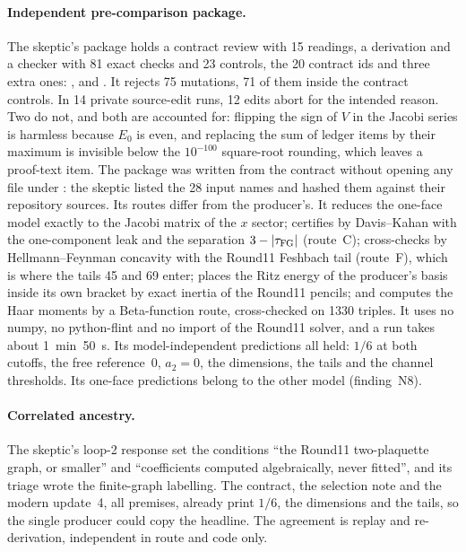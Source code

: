 \paragraph{Independent pre-comparison package.}
The skeptic's package holds a contract review with 15 readings, a derivation
and a checker with 81 exact checks and 23 controls, the 20 contract ids and
three extra ones: ,
 and .
It rejects 75 mutations, 71 of them inside the contract controls. In 14
private source-edit runs, 12 edits abort for the intended reason. Two do not,
and both are accounted for: flipping the sign of $V$ in the Jacobi series is
harmless because $E_0$ is even, and replacing the sum of ledger items by their
maximum is invisible below the $10^{-100}$ square-root rounding, which leaves
a proof-text item. The package was written from the contract without opening
any file under : the skeptic listed the 28 input
names and hashed them against their repository sources. Its routes differ
from the producer's. It reduces the one-face model exactly to the Jacobi
matrix of the $x$ sector; certifies by Davis--Kahan with the one-component
leak and the separation $3-|\tau_{\mathrm{FG}}|$ (route~C); cross-checks by
Hellmann--Feynman concavity with the Round11 Feshbach tail (route~F), which is
where the tails 45 and 69 enter; places the Ritz energy of the producer's
basis inside its own bracket by exact inertia of the Round11 pencils; and
computes the Haar moments by a Beta-function route, cross-checked on 1330
triples. It uses no numpy, no python-flint and no import of the Round11
solver, and a run takes about 1~min~50~s. Its model-independent predictions
all held: $1/6$ at both cutoffs, the free reference~0, $a_2=0$, the
dimensions, the tails and the channel thresholds. Its one-face predictions
belong to the other model (finding~N8).

\paragraph{Correlated ancestry.}
The skeptic's loop-2 response set the conditions ``the Round11 two-plaquette
graph, or smaller'' and ``coefficients computed algebraically, never
fitted'', and its triage wrote the finite-graph labelling. The contract, the
selection note and the modern update~4, all premises, already print $1/6$,
the dimensions and the tails, so the single producer could copy the headline.
The agreement is replay and re-derivation, independent in route and code
only.

